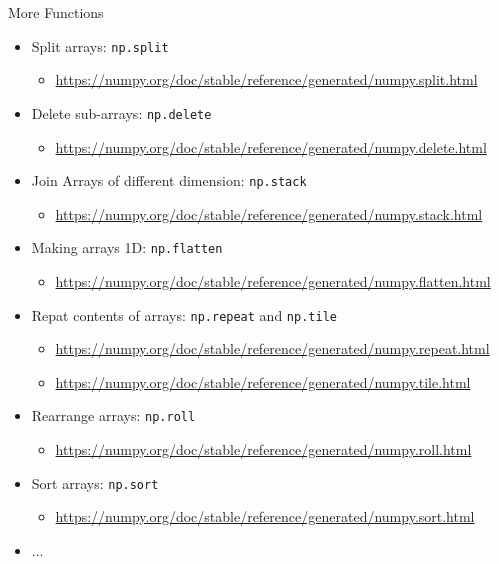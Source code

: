 
\begin{frame}[fragile]{More Functions}
%
\begin{itemize}
\item Split arrays: \texttt{np.split}
	\begin{itemize}
	\item \scriptsize \url{https://numpy.org/doc/stable/reference/generated/numpy.split.html}
	\end{itemize}
\item Delete sub-arrays: \texttt{np.delete}
	\begin{itemize}
	\item \scriptsize \url{https://numpy.org/doc/stable/reference/generated/numpy.delete.html}
	\end{itemize}
\item Join Arrays of different dimension: \texttt{np.stack}
	\begin{itemize}
	\item \scriptsize \url{https://numpy.org/doc/stable/reference/generated/numpy.stack.html}
	\end{itemize}
\item Making arrays 1D: \texttt{np.flatten}
	\begin{itemize}
	\item \scriptsize \url{https://numpy.org/doc/stable/reference/generated/numpy.flatten.html}
	\end{itemize}
\item Repat contents of arrays: \texttt{np.repeat} and \texttt{np.tile}
	\begin{itemize}
	\item \scriptsize \url{https://numpy.org/doc/stable/reference/generated/numpy.repeat.html}
	\item \scriptsize \url{https://numpy.org/doc/stable/reference/generated/numpy.tile.html}
	\end{itemize}
\item Rearrange arrays: \texttt{np.roll}
	\begin{itemize}
	\item \scriptsize \url{https://numpy.org/doc/stable/reference/generated/numpy.roll.html}
	\end{itemize}
\item Sort arrays: \texttt{np.sort}
	\begin{itemize}
	\item \scriptsize \url{https://numpy.org/doc/stable/reference/generated/numpy.sort.html}
	\end{itemize}
\item ...
\end{itemize}
%
\end{frame}


